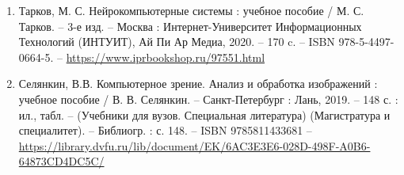\documentclass[../document.tex]{subfiles}
\begin{document}
\begin{enumerate}
    \item Тарков, М. С. Нейрокомпьютерные системы : учебное пособие / М. С. Тарков. -- 3-е изд. -- Москва : Интернет-Университет Информационных Технологий (ИНТУИТ), Ай Пи Ар Медиа, 2020. -- 170 c. -- ISBN 978-5-4497-0664-5. -- \href{https://www.iprbookshop.ru/97551.html}{https://www.iprbookshop.ru/97551.html}
    \item Селянкин, В.В. Компьютерное зрение. Анализ и обработка изображений : учебное пособие / В. В. Селянкин. -- Санкт-Петербург : Лань, 2019. -- 148 с. : ил., табл. -- (Учебники для вузов. Специальная литература) (Магистратура и специалитет). -- Библиогр. : с. 148. -- ISBN 9785811433681 -- \href{https://library.dvfu.ru/lib/document/EK/6AC3E3E6-028D-498F-A0B6-64873CD4DC5C/}{https://library.dvfu.ru/lib/document/EK/6AC3E3E6-028D-498F-A0B6-64873CD4DC5C/}
\end{enumerate}
\end{document}
